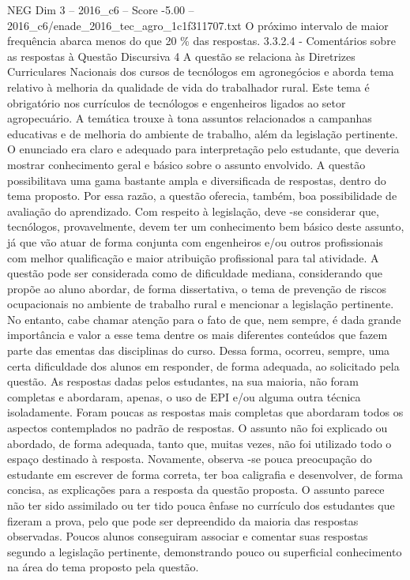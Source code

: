 \begin{textsample}{NEG Dim 3 – 2016\_c6 – Score -5.00 – 2016\_c6/enade\_2016\_tec\_agro\_1c1f311707.txt}
O próximo intervalo de maior frequência abarca menos do que 20 \% das respostas. 3.3.2.4 - Comentários sobre as respostas à Questão Discursiva 4 A questão se relaciona às Diretrizes Curriculares Nacionais dos cursos de tecnólogos em agronegócios e aborda tema relativo à melhoria da qualidade de vida do trabalhador rural.
Este tema é obrigatório nos currículos de tecnólogos e engenheiros ligados ao setor agropecuário.
A temática trouxe à tona assuntos relacionados a campanhas educativas e de melhoria do ambiente de trabalho, além da legislação pertinente.
O enunciado era claro e adequado para interpretação pelo estudante, que deveria mostrar conhecimento geral e básico sobre o assunto envolvido.
A questão possibilitava uma gama bastante ampla e diversificada de respostas, dentro do tema proposto.
Por essa razão, a questão oferecia, também, boa possibilidade de avaliação do aprendizado.
Com respeito à legislação, deve -se considerar que, tecnólogos, provavelmente, devem ter um conhecimento bem básico deste assunto, já que vão atuar de forma conjunta com engenheiros e/ou outros profissionais com melhor qualificação e maior atribuição profissional para tal atividade.
A questão pode ser considerada como de dificuldade mediana, considerando que propõe ao aluno abordar, de forma dissertativa, o tema de prevenção de riscos ocupacionais no ambiente de trabalho rural e mencionar a legislação pertinente.
No entanto, cabe chamar atenção para o fato de que, nem sempre, é dada grande importância e valor a esse tema dentre os mais diferentes conteúdos que fazem parte das ementas das disciplinas do curso.
Dessa forma, ocorreu, sempre, uma certa dificuldade dos alunos em responder, de forma adequada, ao solicitado pela questão.
As respostas dadas pelos estudantes, na sua maioria, não foram completas e abordaram, apenas, o uso de EPI e/ou alguma outra técnica isoladamente.
Foram poucas as respostas mais completas que abordaram todos os aspectos contemplados no padrão de respostas.
O assunto não foi explicado ou abordado, de forma adequada, tanto que, muitas vezes, não foi utilizado todo o espaço destinado à resposta.
Novamente, observa -se pouca preocupação do estudante em escrever de forma correta, ter boa caligrafia e desenvolver, de forma concisa, as explicações para a resposta da questão proposta.
O assunto parece não ter sido assimilado ou ter tido pouca ênfase no currículo dos estudantes que fizeram a prova, pelo que pode ser depreendido da maioria das respostas observadas.
Poucos alunos conseguiram associar e comentar suas respostas segundo a legislação pertinente, demonstrando pouco ou superficial conhecimento na área do tema proposto pela questão.

\end{textsample}
